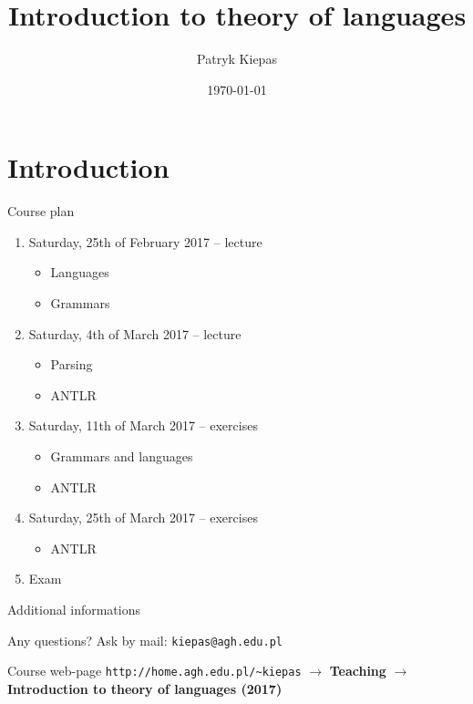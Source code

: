 \documentclass{beamer}
\title[Theory of languages]{Introduction to theory of languages}
\author{Patryk Kiepas}
\institute{MINES ParisTech \& AGH}
\date{\today}
\begin{document}
\begin{frame}
  \titlepage
\end{frame}

\section{Introduction}

\begin{frame}{Course plan}

\begin{enumerate}
\item Saturday, 25th of February 2017 -- lecture
\begin{itemize}
\item Languages
\item Grammars
\end{itemize}
\item Saturday, 4th of March 2017 -- lecture
\begin{itemize}
\item Parsing
\item ANTLR
\end{itemize}
\item Saturday, 11th of March 2017 -- exercises
\begin{itemize}
\item Grammars and languages
\item ANTLR
\end{itemize}
\item Saturday, 25th of March 2017 -- exercises
\begin{itemize}
\item ANTLR
\end{itemize}
\item Exam
\end{enumerate}

\end{frame}

\begin{frame}[fragile]{Additional informations}
\begin{alertblock}{Any questions?}
Ask by mail: \verb|kiepas@agh.edu.pl|
\end{alertblock}

\begin{alertblock}{Course web-page}
\verb|http://home.agh.edu.pl/~kiepas| $\rightarrow$ \textbf{Teaching} $\rightarrow$ \textbf{Introduction to theory of languages (2017)}
\end{alertblock}
\end{frame}
\end{document}
